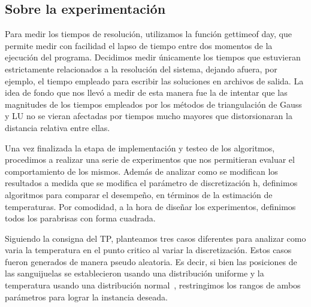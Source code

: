\subsection{Sobre la experimentación}

Para medir los tiempos de resolución, utilizamos la función gettimeof day, que permite medir con
facilidad el lapso de tiempo entre dos momentos de la ejecución del programa. Decidimos medir
únicamente los tiempos que estuvieran estrictamente relacionados a la resolución del sistema,
dejando afuera, por ejemplo, el tiempo empleado para escribir las soluciones en archivos de salida. La
idea de fondo que nos llevó a medir de esta manera fue la de intentar que las magnitudes de los tiempos
empleados por los métodos de triangulación de Gauss y LU no se vieran afectadas por tiempos mucho
mayores que distorsionaran la distancia relativa entre ellas.

Una vez finalizada la etapa de implementación y testeo de los algoritmos, procedimos a realizar una
serie de experimentos que nos permitieran evaluar el comportamiento de los mismos. Además de
analizar como se modifican los resultados a medida que se modifica el parámetro de discretización
h, definimos algoritmos para comparar el desempeño, en términos de la estimación de temperaturas.
Por comodidad, a la hora de diseñar los experimentos, definimos todos los parabrisas con forma cuadrada.

Siguiendo la consigna del TP, planteamos tres casos diferentes para analizar como varia la temperatura 
en el punto critico al variar la discretización. Estos casos fueron generados de manera pseudo aleatoria. Es decir, si bien las posiciones de las sanguijuelas se establecieron usando una distribución uniforme y la temperatura usando una distribución normal~\cite{proba}, restringimos los rangos de ambos parámetros para lograr la instancia deseada.
